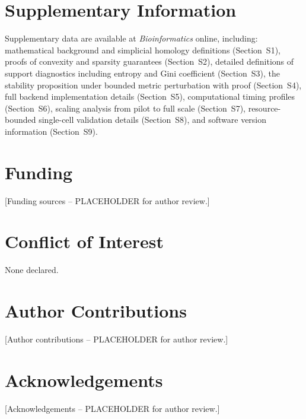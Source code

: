 \documentclass[12pt]{article}
\begin{document}
\section*{Supplementary Information}
Supplementary data are available at \textit{Bioinformatics} online, including:
mathematical background and simplicial homology definitions (Section~S1),
proofs of convexity and sparsity guarantees (Section~S2),
detailed definitions of support diagnostics including entropy and Gini coefficient (Section~S3),
the stability proposition under bounded metric perturbation with proof (Section~S4),
full backend implementation details (Section~S5),
computational timing profiles (Section~S6),
scaling analysis from pilot to full scale (Section~S7),
resource-bounded single-cell validation details (Section~S8),
and software version information (Section~S9).

\section*{Funding}
[Funding sources -- PLACEHOLDER for author review.]

\section*{Conflict of Interest}
None declared.

\section*{Author Contributions}
[Author contributions -- PLACEHOLDER for author review.]

\section*{Acknowledgements}
[Acknowledgements -- PLACEHOLDER for author review.]
\end{document}
